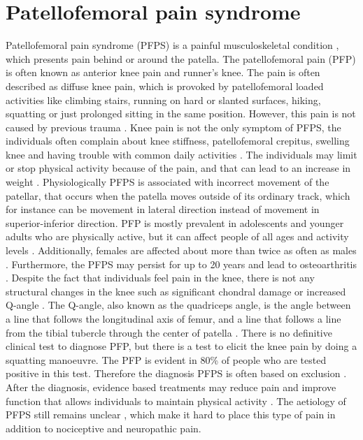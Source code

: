 \section{Patellofemoral pain syndrome}
Patellofemoral pain syndrome (PFPS) is a painful musculoskeletal condition \citep{Maclachlan2017, Smith2015}, which presents pain behind or around the patella. The patellofemoral pain (PFP) is often known as anterior knee pain and runner’s knee. The pain is often described as diffuse knee pain, which is provoked by patellofemoral loaded activities like climbing stairs, running on hard or slanted surfaces, hiking, squatting or just prolonged sitting in the same position.\citep{Smith2015, Crossley2016, Boudreau2017, Crossley2015} However, this pain is not caused by previous trauma \citep{Crossley2016}.
Knee pain is not the only symptom of PFPS, the individuals often complain about knee stiffness, patellofemoral crepitus, swelling knee and having trouble with common daily activities \citep{Crossley2016, Martini2012}. The individuals may limit or stop physical activity because of the pain, and that can lead to an increase in weight \citep{Petersen2013, Crossley2016}.\newline
\noindent
Physiologically PFPS is associated with incorrect movement of the patellar, that occurs when the patella moves outside of its ordinary track, which for instance can be movement in lateral direction instead of movement in superior-inferior direction.\citep{Martini2012} \newline
\noindent
PFP is mostly prevalent in adolescents and younger adults who are physically active, but it can affect people of all ages and activity levels \citep{Maclachlan2017, Crossley2016, Crossley2015}. Additionally,  females are affected about more than twice as often as males \citep{Petersen2013}. Furthermore, the PFPS may persist for up to 20 years and lead to osteoarthritis \citep{Petersen2013, Crossley2016}.\newline
\noindent
Despite the fact that individuals feel pain in the knee, there is not any structural changes in the knee such as significant chondral damage or increased Q-angle \citep{Petersen2013}. The Q-angle, also known as the quadriceps angle, is the angle between a line that follows the longitudinal axis of femur, and a line that follows a line from the tibial tubercle through the center of patella \citep{Dahab2011}. \newline
\noindent
There is no definitive clinical test to diagnose PFP, but there is a test to elicit the knee pain by doing a squatting manoeuvre. The PFP is evident in 80\% of people who are tested positive in this test.\citep{Crossley2016, Crossley2015} Therefore the diagnosis PFPS is often based on exclusion \citep{Petersen2013}. After the diagnosis, evidence based treatments may reduce pain and improve function that allows individuals to maintain physical activity \citep{Crossley2015}.
The aetiology of PFPS still remains unclear \citep{Smith2015}, which make it hard to place this type of pain in addition to nociceptive and neuropathic pain.



